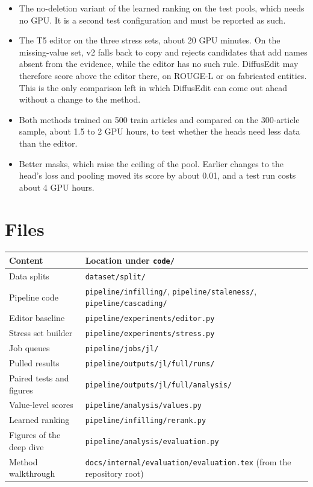 \documentclass[]{paper}
\begin{document}
\begin{itemize}
\item The no-deletion variant of the learned ranking on the test pools, which needs no GPU\@. It is a second test configuration and must be reported as such.
\item The T5 editor on the three stress sets, about 20 GPU minutes. On the missing-value set, v2 falls back to copy and rejects candidates that add names absent from the evidence, while the editor has no such rule. DiffusEdit may therefore score above the editor there, on ROUGE-L or on fabricated entities. This is the only comparison left in which DiffusEdit can come out ahead without a change to the method.
\item Both methods trained on 500 train articles and compared on the 300-article sample, about 1.5 to 2 GPU hours, to test whether the heads need less data than the editor.
\item Better masks, which raise the ceiling of the pool. Earlier changes to the head's loss and pooling moved its score by about 0.01, and a test run costs about 4 GPU hours.
\end{itemize}


\section{Files}

\begin{table}[H]
\centering
\footnotesize
\begin{tabular}{ll}
\toprule
Content & Location under \texttt{code/} \\
\midrule
Data splits & \texttt{dataset/split/} \\
Pipeline code & \texttt{pipeline/infilling/}, \texttt{pipeline/staleness/}, \texttt{pipeline/cascading/} \\
Editor baseline & \texttt{pipeline/experiments/editor.py} \\
Stress set builder & \texttt{pipeline/experiments/stress.py} \\
Job queues & \texttt{pipeline/jobs/jl/} \\
Pulled results & \texttt{pipeline/outputs/jl/full/runs/} \\
Paired tests and figures & \texttt{pipeline/outputs/jl/full/analysis/} \\
Value-level scores & \texttt{pipeline/analysis/values.py} \\
Learned ranking & \texttt{pipeline/infilling/rerank.py} \\
Figures of the deep dive & \texttt{pipeline/analysis/evaluation.py} \\
Method walkthrough & \texttt{docs/internal/evaluation/evaluation.tex} (from the repository root) \\
\bottomrule
\end{tabular}
\end{table}



\end{document}
